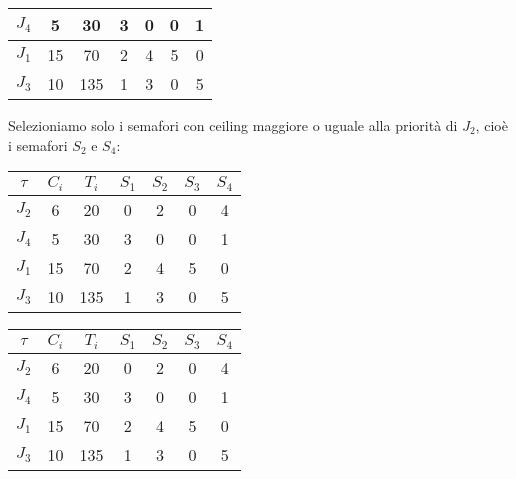 \begin{Esercizio1}
\begin{table}[h]
\begin{tabular}{|c|c|c|c|c|c|c|}
\arrayrulecolor{red}\hline
\arrayrulecolor{black}

$J_4$ & 5 & 30 & 3 & 0 & 0 & 1 \\
\hline
$J_1$ & 15 & 70 & 2 & 4 & 5 & 0 \\
\hline
$J_3$ & 10 & 135 & 1 & 3 & 0 & 5 \\
\hline
\end{tabular}
\label{tab:task_periodici}
\end{table}

Selezioniamo solo i semafori con ceiling maggiore o uguale
alla priorità di \(J_{2}\), cioè i semafori \(S_{2}\) e \(S_{4}\):






\begin{table}[!h]
\centering
\begin{tabular}{|c|c|c|c|c|c|c|}
\hline
\(\tau\) & $C_i$ & $T_i$ & $S_1$ &  \cellcolor{blue!20} $S_2$ & $S_3$ & \cellcolor{blue!20} $S_4$ \\
\hline
$J_2$ & 6 & 20 & 0 & 2 & 0 & 4 \\

\arrayrulecolor{red}\hline
\arrayrulecolor{black}

$J_4$ & 5 & 30 & 3 & 0 & 0 & 1 \\
\hline
$J_1$ & 15 & 70 & 2 & 4 & 5 & 0 \\
\hline
$J_3$ & 10 & 135 & 1 & 3 & 0 & 5 \\
\hline
\end{tabular}
\label{tab:task_periodici}
\end{table}


\begin{table}[!h]
\centering
\begin{tabular}{|c|c|c|c|c|c|c|}
\hline
\(\tau\) & $C_i$ & $T_i$ & $S_1$ & $S_2$ & $S_3$ & $S_4$ \\
\hline
$J_2$ & 6 & 20 & 0 & 2 & 0 & 4 \\

\arrayrulecolor{red}\hline
\arrayrulecolor{black}

$J_4$ & 5 & 30 & 3 & \cellcolor{blue!20}0 & 0 & \cellcolor{blue!20}1 \\
\hline
$J_1$ & 15 & 70 & 2 & \cellcolor{blue!20}4 & 5 & \cellcolor{blue!20}0 \\
\hline
$J_3$ & 10 & 135 & 1 & \cellcolor{blue!20}3 & 0 & \cellcolor{blue!20}5 \\
\hline
\end{tabular}
\label{tab:task_periodici}
\end{table}






\end{Esercizio1}
